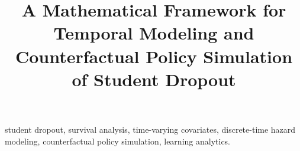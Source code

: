 \documentclass[conference,a4paper]{IEEEtran}
\begin{document}
\title{A Mathematical Framework for Temporal Modeling and Counterfactual Policy Simulation of Student Dropout}

\author{
}

\maketitle



\begin{IEEEkeywords}
student dropout, survival analysis, time-varying covariates, discrete-time hazard modeling, counterfactual policy simulation, learning analytics.
\end{IEEEkeywords}

\IEEEpeerreviewmaketitle








\appendices




\end{document}
